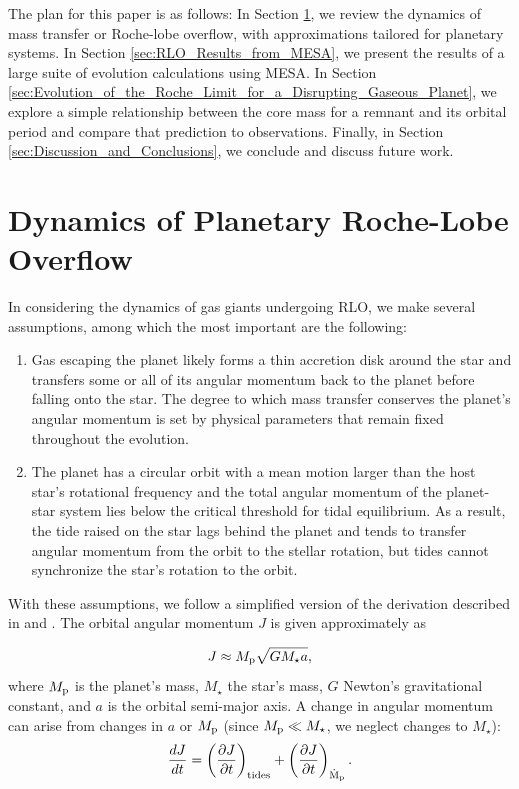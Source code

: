\documentclass{svjour3}                     %
\begin{document}
The plan for this paper is as follows: In Section \ref{sec:dynamics_of_planetary_rochelobe_overflow}, we review the dynamics of mass transfer or Roche-lobe overflow, with approximations tailored for planetary systems. In Section \ref{sec:RLO_Results_from_MESA}, we present the results of a large suite of evolution calculations using MESA. In Section \ref{sec:Evolution_of_the_Roche_Limit_for_a_Disrupting_Gaseous_Planet}, we explore a simple relationship between the core mass for a remnant and its orbital period and compare that prediction to observations. Finally, in Section \ref{sec:Discussion_and_Conclusions}, we conclude and discuss future work.

\section{Dynamics of Planetary Roche-Lobe Overflow}
\label{sec:dynamics_of_planetary_rochelobe_overflow}
In considering the dynamics of gas giants undergoing RLO, we make several assumptions, among which the most important are the following:

\begin{enumerate}
\item Gas escaping the planet likely forms a thin accretion disk around the star and transfers some or all of its angular momentum back to the planet before falling onto the star. The degree to which mass transfer conserves the planet's angular momentum is set by physical parameters that remain fixed throughout the evolution. 

\item The planet has a circular orbit with a mean motion larger than the host star's rotational frequency and the total angular momentum of the planet-star system lies below the critical threshold for tidal equilibrium. As a result, the tide raised on the star lags behind the planet and tends to transfer angular momentum from the orbit to the stellar rotation, but tides cannot synchronize the star's rotation to the orbit.

\end{enumerate}

With these assumptions, we follow a simplified version of the derivation described in \cite{Rappaport1982} and \cite{2015ApJ...813..101V}. The orbital angular momentum $J$ is given approximately as 

\begin{equation}
J \approx M_{\rm p} \sqrt{G M_{\star} a},
\label{eqn:orbital_angular_momentum}
\end{equation}
where $M_{\rm p}$ is the planet's mass, $M_\star$ the star's mass, $G$ Newton's gravitational constant, and $a$ is the orbital semi-major axis. A change in angular momentum can arise from changes in $a$ or $M_{\rm p}$ (since $M_{\rm p} \ll M_{\star}$, we neglect changes to $M_{\star}$):
\begin{equation}
\frac{dJ}{dt} = \left(\frac{\partial J}{\partial t}\right)_{\rm tides} + \left(\frac{\partial J}{\partial t}\right)_{\rm \dot{M}_{\rm p}}.
\label{eqn:change_in_orbital_angular_momentum}
\end{equation}
\end{document}
